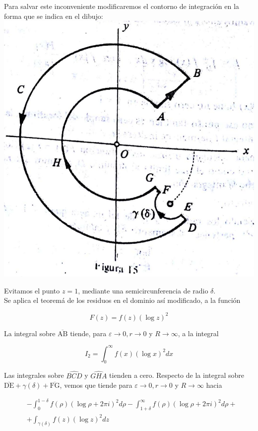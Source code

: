 \documentclass[10pt]{article}
\theoremstyle{plain}
\theoremstyle{definition}
\theoremstyle{remark}
\begin{document}
Para salvar este inconveniente modificaremos el contorno de integración en la forma que se indica en el dibujo:\\
\includegraphics[max width=\textwidth, center]{2025_09_05_adecef5eb2053bc129b5g-113}

Evitamos el punto $z=1$, mediante una semicircunferencia de radio $\delta$.\\
Se aplica el teoremá de los residuos en el dominio así modificado, a la función

$$
F(z)=f(z)(\log z)^{2}
$$

La integral sobre $\overline{\mathrm{AB}}$ tiende, para $\varepsilon \rightarrow 0, r \rightarrow 0$ y $R \rightarrow \infty$, a la integral

$$
I_{2}=\int_{0}^{\infty} f(x)(\log x)^{2} d x
$$

Las integrales sobre $\widehat{B C D}$ y $\widehat{G H A}$ tienden a cero. Respecto de la integral sobre $\overline{\mathrm{DE}}+\gamma(\delta)+\overline{\mathrm{FG}}$, vemos que tiende para $\varepsilon \rightarrow 0, r \rightarrow 0$ y $R \rightarrow \infty$ hacia

$$
\begin{aligned}
& -\int_{0}^{1-\delta} f(\rho)(\log \rho+2 \pi i)^{2} d \rho-\int_{1+\delta}^{\infty} f(\rho)(\log \rho+2 \pi i)^{2} d \rho+ \\
& +\int_{\gamma(\delta)} f(z)(\log z)^{2} d z
\end{aligned}
$$
\end{document}
